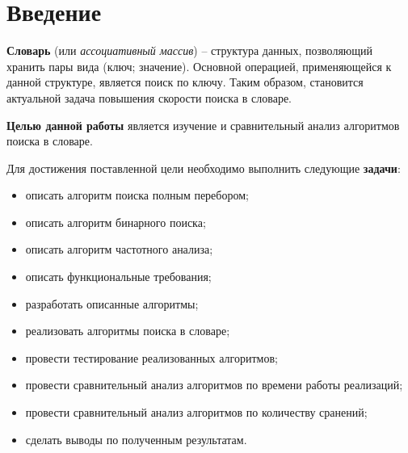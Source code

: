 \chapter*{Введение}

\textbf{Словарь} (или \textit{ассоциативный массив}) \cite{NIST} -- структура данных,
позволяющий хранить пары вида (ключ; значение). Основной операцией,
применяющейся к данной структуре, является поиск по ключу. Таким образом,
становится актуальной задача повышения скорости поиска в словаре.

\textbf{Целью данной работы} является изучение и сравнительный анализ
алгоритмов поиска в словаре.

Для достижения поставленной цели необходимо выполнить следующие
\textbf{задачи}:
\begin{itemize}[left=\parindent]
    \item описать алгоритм поиска полным перебором;
    \item описать алгоритм бинарного поиска;
    \item описать алгоритм частотного анализа;
    \item описать функциональные требования;
    \item разработать описанные алгоритмы;
    \item реализовать алгоритмы поиска в словаре;
    \item провести тестирование реализованных алгоритмов;
    \item провести сравнительный анализ алгоритмов по времени работы
          реализаций;
    \item провести сравнительный анализ алгоритмов по количеству сранений;
    \item сделать выводы по полученным результатам.
\end{itemize}
